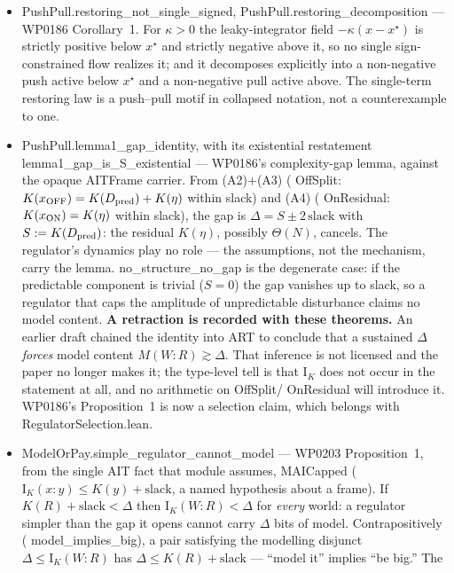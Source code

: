 \documentclass[11pt,a4paper]{article}
\newcommand{\lean}[1]{{\ttfamily\small
  \let\leanunderscore\_\def\_{\leanunderscore\allowbreak}#1}}
\newcommand{\Ik}{\mathrm{I}_K}
\begin{document}
\begin{itemize}[leftmargin=1.4em,itemsep=1pt]
$|S|\ge2$; and two flows, one of each sign, achieve it, so the bound is tight. Two pushes do not
regulate however many there are.
\item \lean{PushPull.restoring\_not\_single\_signed}, \lean{PushPull.restoring\_decomposition} ---
WP0186 Corollary~1. For $\kappa>0$ the leaky-integrator field $-\kappa(x-x^\star)$ is strictly
positive below $x^\star$ and strictly negative above it, so no single sign-constrained flow realizes
it; and it decomposes explicitly into a non-negative push active below $x^\star$ and a non-negative
pull active above. The single-term restoring law is a push--pull motif in collapsed notation, not a
counterexample to one.
\item \lean{PushPull.lemma1\_gap\_identity}, with its existential restatement
\lean{lemma1\_gap\_is\_S\_existential} --- WP0186's complexity-gap lemma, against the opaque
\lean{AITFrame} carrier. From (A2)$+$(A3) (\lean{OffSplit}: $K(x_{\rm OFF})=K(D_{\rm pred})+K(\eta)$
within slack) and (A4) (\lean{OnResidual}: $K(x_{\rm ON})=K(\eta)$ within slack), the gap is
$\Delta=S\pm2\,\mathrm{slack}$ with $S:=K(D_{\rm pred})$: the residual $K(\eta)$, possibly
$\Theta(N)$, cancels. The regulator's dynamics play no role --- the assumptions, not the mechanism,
carry the lemma. \lean{no\_structure\_no\_gap} is the degenerate case: if the predictable component
is trivial ($S=0$) the gap vanishes up to slack, so a regulator that caps the amplitude of
unpredictable disturbance claims no model content. \textbf{A retraction is recorded with these
theorems.} An earlier draft chained the identity into ART to conclude that a sustained $\Delta$
\emph{forces} model content $M(W{:}R)\gtrsim\Delta$. That inference is not licensed and the paper no
longer makes it; the type-level tell is that $\Ik$ does not occur in the statement at all, and no
arithmetic on \lean{OffSplit}/\lean{OnResidual} will introduce it. WP0186's Proposition~1 is now a
selection claim, which belongs with \lean{RegulatorSelection.lean}.
\item \lean{ModelOrPay.simple\_regulator\_cannot\_model} --- WP0203 Proposition~1, from the single
AIT fact that module assumes, \lean{MAICapped} ($\Ik(x{:}y)\le K(y)+\mathrm{slack}$, a named
hypothesis about a frame). If $K(R)+\mathrm{slack}<\Delta$ then $\Ik(W{:}R)<\Delta$ for
\emph{every} world: a regulator simpler than the gap it opens cannot carry $\Delta$ bits of model.
Contrapositively (\lean{model\_implies\_big}), a pair satisfying the modelling disjunct
$\Delta\le\Ik(W{:}R)$ has $\Delta\le K(R)+\mathrm{slack}$ --- ``model it'' implies ``be big.'' The

\end{itemize}
\end{document}
